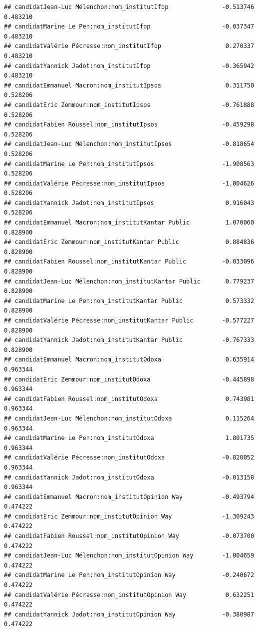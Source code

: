 \documentclass[
]{book}
\begin{document}
\begin{verbatim}
## candidatJean-Luc Mélenchon:nom_institutIfop               -0.513746   0.483210
## candidatMarine Le Pen:nom_institutIfop                    -0.037347   0.483210
## candidatValérie Pécresse:nom_institutIfop                  0.270337   0.483210
## candidatYannick Jadot:nom_institutIfop                    -0.365942   0.483210
## candidatEmmanuel Macron:nom_institutIpsos                  0.311750   0.528206
## candidatEric Zemmour:nom_institutIpsos                    -0.761888   0.528206
## candidatFabien Roussel:nom_institutIpsos                  -0.459298   0.528206
## candidatJean-Luc Mélenchon:nom_institutIpsos              -0.818654   0.528206
## candidatMarine Le Pen:nom_institutIpsos                   -1.908563   0.528206
## candidatValérie Pécresse:nom_institutIpsos                -1.004626   0.528206
## candidatYannick Jadot:nom_institutIpsos                    0.916043   0.528206
## candidatEmmanuel Macron:nom_institutKantar Public          1.070060   0.828900
## candidatEric Zemmour:nom_institutKantar Public             0.884836   0.828900
## candidatFabien Roussel:nom_institutKantar Public          -0.033096   0.828900
## candidatJean-Luc Mélenchon:nom_institutKantar Public       0.779237   0.828900
## candidatMarine Le Pen:nom_institutKantar Public            0.573332   0.828900
## candidatValérie Pécresse:nom_institutKantar Public        -0.577227   0.828900
## candidatYannick Jadot:nom_institutKantar Public           -0.767333   0.828900
## candidatEmmanuel Macron:nom_institutOdoxa                  0.635914   0.963344
## candidatEric Zemmour:nom_institutOdoxa                    -0.445898   0.963344
## candidatFabien Roussel:nom_institutOdoxa                   0.743981   0.963344
## candidatJean-Luc Mélenchon:nom_institutOdoxa               0.115264   0.963344
## candidatMarine Le Pen:nom_institutOdoxa                    1.801735   0.963344
## candidatValérie Pécresse:nom_institutOdoxa                -0.820052   0.963344
## candidatYannick Jadot:nom_institutOdoxa                   -0.013158   0.963344
## candidatEmmanuel Macron:nom_institutOpinion Way           -0.493794   0.474222
## candidatEric Zemmour:nom_institutOpinion Way              -1.309243   0.474222
## candidatFabien Roussel:nom_institutOpinion Way            -0.073700   0.474222
## candidatJean-Luc Mélenchon:nom_institutOpinion Way        -1.004659   0.474222
## candidatMarine Le Pen:nom_institutOpinion Way             -0.240672   0.474222
## candidatValérie Pécresse:nom_institutOpinion Way           0.632251   0.474222
## candidatYannick Jadot:nom_institutOpinion Way             -0.380987   0.474222

\end{verbatim}
\end{document}
